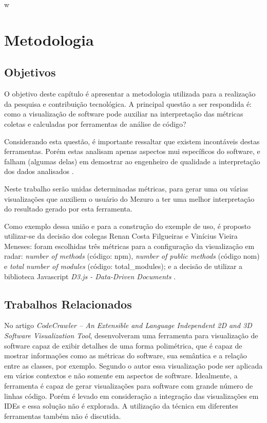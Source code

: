 w\chapter{Metodologia}

\section{Objetivos}

O objetivo deste capítulo é apresentar a metodologia utilizada para a
realização da pesquisa e contribuição tecnológica. A principal questão
a ser respondida é: como a visualização de software pode auxiliar na
interpretação das métricas coletas e calculadas por ferramentas de análise
de código?

Considerando esta questão, é importante ressaltar que existem incontáveis
destas ferramentas. Porém estas analisam apenas aspectos mui específicos
do software, e falham (algumas delas) em demostrar ao engenheiro de
qualidade a interpretação dos dados analisados \cite{deissenboeck2011quamoco}.

Neste trabalho serão unidas determinadas métricas, para gerar uma ou várias
visualizações que auxiliem o usuário do Mezuro a ter uma melhor interpretação do
resultado gerado por esta
ferramenta.

Como exemplo dessa união e para a construção do exemple de uso, é proposto
utilizar-se da decisão dos colegas Renan Costa Filgueiras e Vinícius Vieira
Meneses: foram escolhidas três métricas para a configuração da visualização em
radar: \textit{number of methods} (código: npm), \textit{number of public
methods} (código nom) e \textit{total number of modules} (código:
total\_modules); e a decisão de utilizar a biblioteca Javascript \textit{D3.js -
Data-Driven Documents} \cite{filgueiras2014mezuro}.

\section{Trabalhos Relacionados}

No artigo \textit{CodeCrawler – An Extensible and Language Independent 2D and
3D Software Visualization Tool}, 
desenvolveram uma ferramenta para visualização de software capaz de exibir
detalhes de uma forma polimétrica, que é capaz de mostrar informações como as
métricas do software, sua semântica e a relação entre as classes, por exemplo.
Segundo o autor essa visualização pode ser aplicada em vários contextos e não
somente em aspectos de software. Idealmente, a ferramenta é capaz de gerar
visualizações para software com grande número de linhas código. Porém é levado
em consideração a integração das visualizações em IDEs e essa solução não é
explorada. A utilização da técnica em diferentes ferramentas também não é
discutida.

